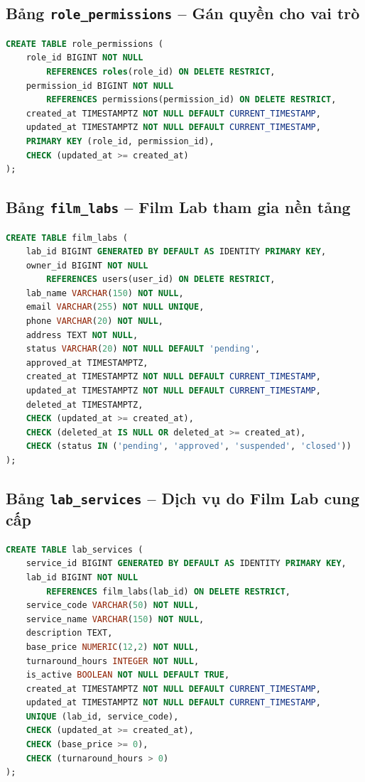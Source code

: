 \subsection{Bảng \texttt{role\_permissions} -- Gán quyền cho vai trò}
\label{physical-role_permissions}
\begin{lstlisting}[language=SQL,breaklines=true,basicstyle=\ttfamily\scriptsize]
CREATE TABLE role_permissions (
    role_id BIGINT NOT NULL
        REFERENCES roles(role_id) ON DELETE RESTRICT,
    permission_id BIGINT NOT NULL
        REFERENCES permissions(permission_id) ON DELETE RESTRICT,
    created_at TIMESTAMPTZ NOT NULL DEFAULT CURRENT_TIMESTAMP,
    updated_at TIMESTAMPTZ NOT NULL DEFAULT CURRENT_TIMESTAMP,
    PRIMARY KEY (role_id, permission_id),
    CHECK (updated_at >= created_at)
);
\end{lstlisting}
\subsection{Bảng \texttt{film\_labs} -- Film Lab tham gia nền tảng}
\label{physical-film_labs}
\begin{lstlisting}[language=SQL,breaklines=true,basicstyle=\ttfamily\scriptsize]
CREATE TABLE film_labs (
    lab_id BIGINT GENERATED BY DEFAULT AS IDENTITY PRIMARY KEY,
    owner_id BIGINT NOT NULL
        REFERENCES users(user_id) ON DELETE RESTRICT,
    lab_name VARCHAR(150) NOT NULL,
    email VARCHAR(255) NOT NULL UNIQUE,
    phone VARCHAR(20) NOT NULL,
    address TEXT NOT NULL,
    status VARCHAR(20) NOT NULL DEFAULT 'pending',
    approved_at TIMESTAMPTZ,
    created_at TIMESTAMPTZ NOT NULL DEFAULT CURRENT_TIMESTAMP,
    updated_at TIMESTAMPTZ NOT NULL DEFAULT CURRENT_TIMESTAMP,
    deleted_at TIMESTAMPTZ,
    CHECK (updated_at >= created_at),
    CHECK (deleted_at IS NULL OR deleted_at >= created_at),
    CHECK (status IN ('pending', 'approved', 'suspended', 'closed'))
);
\end{lstlisting}
\subsection{Bảng \texttt{lab\_services} -- Dịch vụ do Film Lab cung cấp}
\label{physical-lab_services}
\begin{lstlisting}[language=SQL,breaklines=true,basicstyle=\ttfamily\scriptsize]
CREATE TABLE lab_services (
    service_id BIGINT GENERATED BY DEFAULT AS IDENTITY PRIMARY KEY,
    lab_id BIGINT NOT NULL
        REFERENCES film_labs(lab_id) ON DELETE RESTRICT,
    service_code VARCHAR(50) NOT NULL,
    service_name VARCHAR(150) NOT NULL,
    description TEXT,
    base_price NUMERIC(12,2) NOT NULL,
    turnaround_hours INTEGER NOT NULL,
    is_active BOOLEAN NOT NULL DEFAULT TRUE,
    created_at TIMESTAMPTZ NOT NULL DEFAULT CURRENT_TIMESTAMP,
    updated_at TIMESTAMPTZ NOT NULL DEFAULT CURRENT_TIMESTAMP,
    UNIQUE (lab_id, service_code),
    CHECK (updated_at >= created_at),
    CHECK (base_price >= 0),
    CHECK (turnaround_hours > 0)
);
\end{lstlisting}
